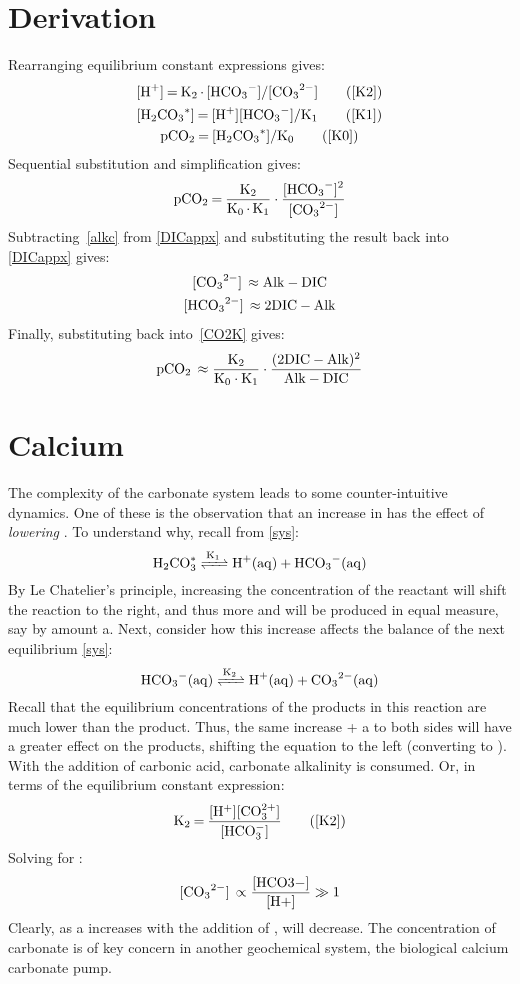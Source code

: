\section{Derivation}
Rearranging equilibrium constant expressions gives:
\begin{gather}
    \ce{[H+] = K2.[HCO3^-]/[CO3^2-]}\tag{\ref{K2}}\\
    \ce{[H2CO3^*] = [H+][HCO3^-]/K1}\tag{\ref{K1}}\\
    \ce{pCO2 = [H_2CO_3^{*}]/K_0}\tag{\ref{K0}}
\end{gather}
Sequential substitution and simplification gives:
\begin{equation}
    \ce{pCO2 = \frac{K2}{K0.K1}\cdot\frac{[HCO3^-]^2}{[CO3^{2-}]}}\label{CO2K}
\end{equation}
Subtracting~\eqref{alkc} from \eqref{DICappx} and substituting the result back into \eqref{DICappx} gives:
\begin{gather}
    \ce{[CO3^2-] \approx Alk - DIC}\\
    \ce{[HCO3^2-] \approx $2$DIC - Alk}
\end{gather}
Finally, substituting back into~\eqref{CO2K} gives:
\begin{equation}
\ce{pCO2 \approx \dfrac{\ce{K2}}{\ce{K0\cdot K1}}\cdot \dfrac{(\ce{$2$DIC - Alk})^2}{\ce{Alk - DIC}}}
\end{equation}
\section{Calcium}
The complexity of the carbonate system leads to some counter-intuitive dynamics. One of these is the observation that an increase in \ce{[H2CO3^*]} has the effect of \textit{lowering} \ce{[CO3^2-]}. To understand why, recall from \eqref{sys}:
\[\ce{H2CO3}^{*}\ce{<=>[K1] H+(aq) + HCO3^-(aq)}\]
By Le Chatelier's principle, increasing the concentration of the reactant  will shift the reaction to the right, and thus more  and  will be produced in equal measure, say by amount a. Next, consider how this increase affects the balance of the next equilibrium \eqref{sys}:
\begin{equation}
    \ce{HCO3-(aq) <=>[K2] H+(aq) + CO3^2-(aq)}
\end{equation}
Recall that the equilibrium concentrations of the products in this reaction are much lower than the product. Thus, the same increase + a to both sides will have a greater effect on the products, shifting the equation to the left (converting  to ). With the addition of carbonic acid, carbonate alkalinity is consumed. Or, in terms of the equilibrium constant expression:
\begin{equation}
    \ce{K2 = \dfrac{[H^+][CO_3^{2+}]}{[HCO_3^-]}}\tag{\ref{K2}}
\end{equation}
Solving for \ce{[CO3^2-]}:
\[\ce{[CO3^2-] \propto \dfrac{[HCO3-]}{[H+]}}\gg1\]
Clearly, as a increases with the addition of , \ce{[CO3^2-]} will decrease.
The concentration of carbonate is of key concern in another geochemical system, the biological calcium carbonate pump.

